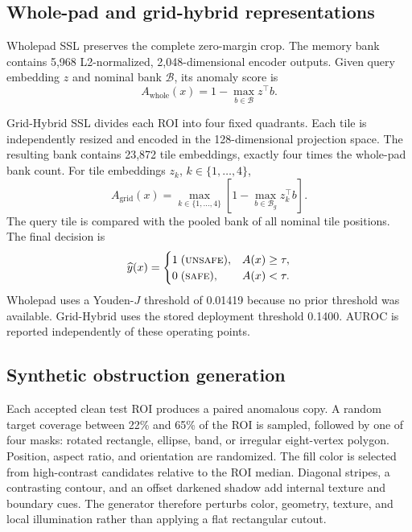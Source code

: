 \documentclass[conference]{IEEEtran}
\begin{document}
\subsection{Whole-pad and grid-hybrid representations}
Wholepad SSL preserves the complete zero-margin crop. The memory bank contains 5,968 L2-normalized, 2,048-dimensional encoder outputs. Given query embedding $z$ and nominal bank $\mathcal{B}$, its anomaly score is
\begin{equation}
A_{\mathrm{whole}}(x)
=1-\max_{b\in\mathcal{B}} z^{\top}b.
\label{eq:whole}
\end{equation}

Grid-Hybrid SSL divides each ROI into four fixed quadrants. Each tile is independently resized and encoded in the 128-dimensional projection space. The resulting bank contains 23,872 tile embeddings, exactly four times the whole-pad bank count. For tile embeddings $z_k$, $k\in\{1,\ldots,4\}$,
\begin{equation}
A_{\mathrm{grid}}(x)
=\max_{k\in\{1,\ldots,4\}}
\left[1-\max_{b\in\mathcal{B}_g}z_k^{\top}b\right].
\label{eq:grid}
\end{equation}
The query tile is compared with the pooled bank of all nominal tile positions. The final decision is
\begin{equation}
\widehat{y}(x)=
\begin{cases}
1\;(\textsc{unsafe}), & A(x)\geq\tau,\\
0\;(\textsc{safe}), & A(x)<\tau.
\end{cases}
\label{eq:decision}
\end{equation}
Wholepad uses a Youden-$J$ threshold of 0.01419 because no prior threshold was available. Grid-Hybrid uses the stored deployment threshold 0.1400. AUROC is reported independently of these operating points.

\subsection{Synthetic obstruction generation}
Each accepted clean test ROI produces a paired anomalous copy. A random target coverage between 22\% and 65\% of the ROI is sampled, followed by one of four masks: rotated rectangle, ellipse, band, or irregular eight-vertex polygon. Position, aspect ratio, and orientation are randomized. The fill color is selected from high-contrast candidates relative to the ROI median. Diagonal stripes, a contrasting contour, and an offset darkened shadow add internal texture and boundary cues. The generator therefore perturbs color, geometry, texture, and local illumination rather than applying a flat rectangular cutout.
\end{document}

